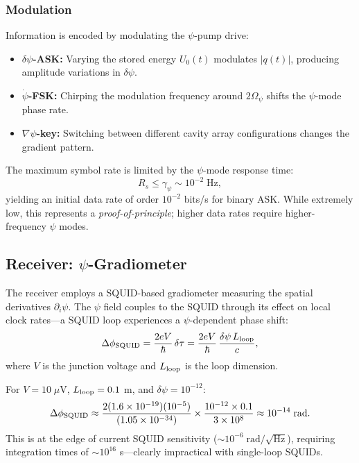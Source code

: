 \documentclass[twocolumn,superscriptaddress,prd,nofootinbib]{revtex4-2}
\begin{document}
\subsubsection{Modulation}

Information is encoded by modulating the $\psi$-pump drive:
\begin{itemize}
\item \textbf{$\delta\psi$-ASK:} Varying the stored energy $U_0(t)$
modulates $|q(t)|$, producing amplitude variations in $\delta\psi$.
\item \textbf{$\dot{\psi}$-FSK:} Chirping the modulation frequency
around $2\Omega_\psi$ shifts the $\psi$-mode phase rate.
\item \textbf{$\nabla\psi$-key:} Switching between different cavity
array configurations changes the gradient pattern.
\end{itemize}

The maximum symbol rate is limited by the $\psi$-mode response time:
\begin{equation}
R_s \leq \gamma_\psi \sim 10^{-2}\;\text{Hz},
\label{eq:symbol-rate}
\end{equation}
yielding an initial data rate of order $10^{-2}$ bits/s for binary ASK.
While extremely low, this represents a \emph{proof-of-principle};
higher data rates require higher-frequency $\psi$ modes.

\subsection{Receiver: $\psi$-Gradiometer}

The receiver employs a SQUID-based gradiometer measuring the spatial
derivatives $\partial_i\psi$.
The $\psi$ field couples to the SQUID through its effect on local clock
rates---a SQUID loop experiences a $\psi$-dependent phase shift:
\begin{equation}
\Delta\phi_{\rm SQUID} = \frac{2eV}{\hbar}\,\delta\tau
= \frac{2eV}{\hbar}\,\frac{\delta\psi\,L_{\rm loop}}{c},
\label{eq:SQUID-phase}
\end{equation}
where $V$ is the junction voltage and $L_{\rm loop}$ is the loop
dimension.

For $V = 10\;\mu$V, $L_{\rm loop} = 0.1$ m, and $\delta\psi = 10^{-12}$:
\begin{equation}
\Delta\phi_{\rm SQUID} \approx \frac{2(1.6\times 10^{-19})(10^{-5})}
{(1.05\times 10^{-34})} \times \frac{10^{-12} \times 0.1}{3\times 10^8}
\approx 10^{-14}\;\text{rad}.
\label{eq:SQUID-sensitivity}
\end{equation}
This is at the edge of current SQUID sensitivity
($\sim 10^{-6}\;\text{rad}/\sqrt{\text{Hz}}$), requiring integration
times of $\sim 10^{16}$ s---clearly impractical with single-loop
SQUIDs.
\end{document}

